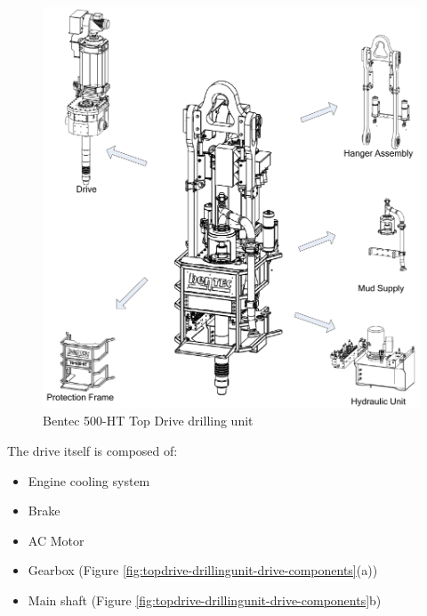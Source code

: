 \begin{figure}[H]
	\centering
	\includegraphics[width=.7\linewidth]{figures/topdrive_drillingunit.png}
	\caption{Bentec 500-HT Top Drive drilling unit}%
	\label{fig:topdrive-drillingunit}
\end{figure}

The drive itself is composed of:

\begin{itemize}
	\item Engine cooling system
	\item Brake
	\item AC Motor
	\item Gearbox (Figure \ref{fig:topdrive-drillingunit-drive-components}(a))
	\item Main shaft (Figure \ref{fig:topdrive-drillingunit-drive-components}b)
\end{itemize}

